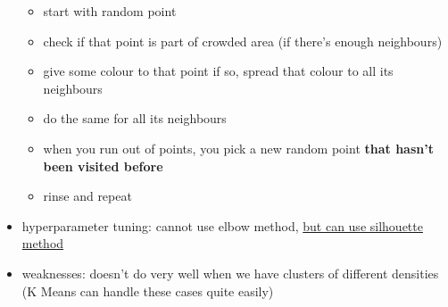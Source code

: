 \documentclass[10.5pt,a4paper, fleqn, dvipsnames]{article}
\begin{document}
\begin{itemize}
    \begin{itemize}[leftmargin = 2em]
        \item start with random point
        \item check if that point is part of crowded area (if there's enough neighbours)
        \item give some colour to that point if so, spread that colour to all its neighbours
        \item do the same for all its neighbours 
        \item when you run out of points, you pick a new random point \textbf{that hasn't been visited before}
        \item rinse and repeat
    \end{itemize}
    \item hyperparameter tuning: cannot use elbow method, \ul{but can use silhouette method}
    \item weaknesses: doesn't do very well when we have clusters of different densities (K Means can handle these cases quite easily)
\end{itemize}
\end{document}
